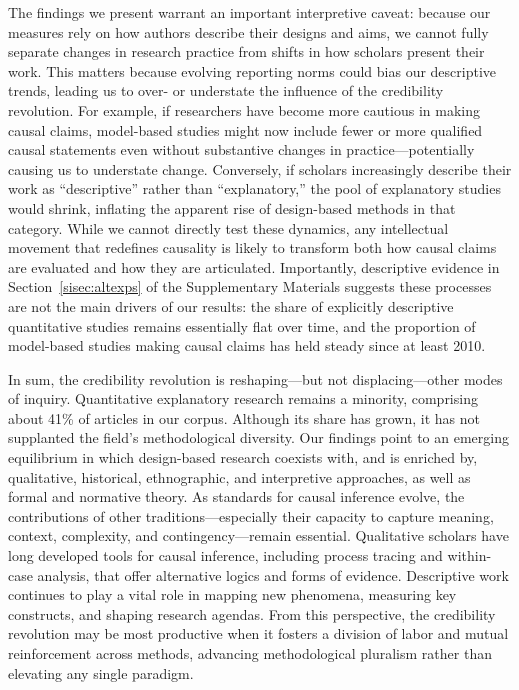 \documentclass[12pt]{article}
\begin{document}
The findings we present warrant an important interpretive caveat: because our measures rely on how authors describe their designs and aims, we cannot fully separate changes in research practice from shifts in how scholars present their work. This matters because evolving reporting norms could bias our descriptive trends, leading us to over- or understate the influence of the credibility revolution. For example, if researchers have become more cautious in making causal claims, model-based studies might now include fewer or more qualified causal statements even without substantive changes in practice—potentially causing us to understate change. Conversely, if scholars increasingly describe their work as “descriptive” rather than “explanatory,” the pool of explanatory studies would shrink, inflating the apparent rise of design-based methods in that category. While we cannot directly test these dynamics, any intellectual movement that redefines causality is likely to transform both how causal claims are evaluated and how they are articulated. Importantly, descriptive evidence in Section~\ref{sisec:altexps} of the Supplementary Materials suggests these processes are not the main drivers of our results: the share of explicitly descriptive quantitative studies remains essentially flat over time, and the proportion of model-based studies making causal claims has held steady since at least 2010.

In sum, the credibility revolution is reshaping---but not displacing---other modes of inquiry. Quantitative explanatory research remains a minority, comprising about 41\% of articles in our corpus. Although its share has grown, it has not supplanted the field’s methodological diversity. Our findings point to an emerging equilibrium in which design-based research coexists with, and is enriched by, qualitative, historical, ethnographic, and interpretive approaches, as well as formal and normative theory. As standards for causal inference evolve, the contributions of other traditions—especially their capacity to capture meaning, context, complexity, and contingency—remain essential. Qualitative scholars have long developed tools for causal inference, including process tracing and within-case analysis, that offer alternative logics and forms of evidence. Descriptive work continues to play a vital role in mapping new phenomena, measuring key constructs, and shaping research agendas. From this perspective, the credibility revolution may be most productive when it fosters a division of labor and mutual reinforcement across methods, advancing methodological pluralism rather than elevating any single paradigm.
\end{document}

